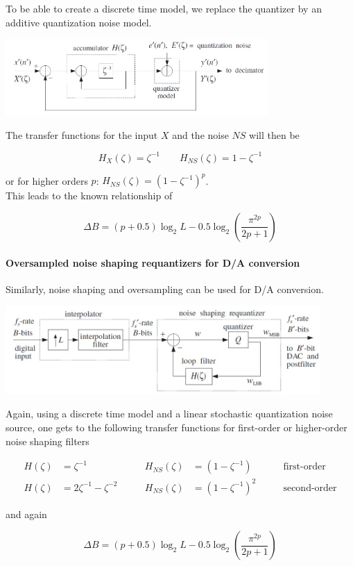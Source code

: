 To be able to create a discrete time model, we replace the quantizer by
an additive quantization noise model.

\begin{center}
	\includegraphics[width=10cm]{images/IntDecOv_SigmaDeltaModel.jpg}
\end{center}

The transfer functions for the input $X$ and the noise $NS$ will then be

\begin{equation*}
	H_X(\zeta) = \zeta^{-1} \qquad H_{NS}(\zeta) = 1 - \zeta^{-1}
\end{equation*}

or for higher orders $p$: $H_{NS}(\zeta) = (1-\zeta^{-1})^p$. \\

This leads to the known relationship of

\begin{equation*}
	\Delta B = (p+0.5) \log_2 L - 0.5 \log_2\left(\frac{\pi^{2p}}{2p+1}\right)
\end{equation*}


\paragraph{Oversampled noise shaping requantizers for D/A conversion}
Similarly, noise shaping and oversampling can be used for D/A conversion.

\begin{center}
	\includegraphics[width=12cm]{images/IntDecOv_Requantizer.jpg}
\end{center}

Again, using a discrete time model and a linear stochastic quantization
noise source, one gets to the following transfer functions for first-order
or higher-order noise shaping filters

\begin{align*}
	H(\zeta) &= \zeta^{-1} \qquad &
	H_{NS}(\zeta) &= (1-\zeta^{-1}) \qquad
	& \text{first-order} \\
	H(\zeta) &= 2 \zeta^{-1} - \zeta^{-2} \qquad &
	H_{NS}(\zeta) &= (1-\zeta^{-1})^2 \qquad
	& \text{second-order}
\end{align*}

and again

\begin{equation*}
	\Delta B = (p+0.5) \log_2 L - 0.5 \log_2\left(\frac{\pi^{2p}}{2p+1}\right)
\end{equation*}

